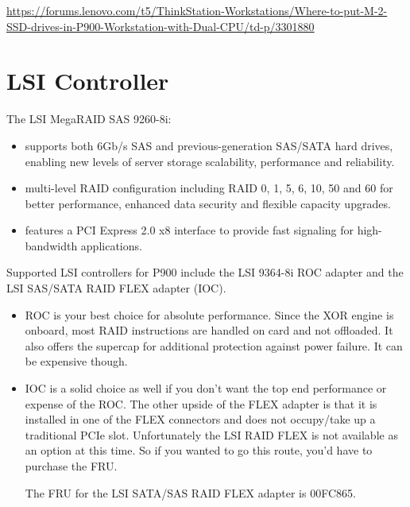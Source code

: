 \url{https://forums.lenovo.com/t5/ThinkStation-Workstations/Where-to-put-M-2-SSD-drives-in-P900-Workstation-with-Dual-CPU/td-p/3301880}



\section{LSI Controller}

The LSI MegaRAID SAS 9260-8i:

\begin{itemize}
   \item  supports both 6Gb/s SAS and
   previous-generation SAS/SATA hard drives, enabling new levels of server
   storage scalability, performance and reliability.   
   
   \item multi-level RAID configuration including RAID 0, 1, 5, 6, 10, 50 and 60
   for better performance, enhanced data security and flexible capacity upgrades.
   
   \item features a PCI Express 2.0 x8 interface to provide fast signaling for
   high-bandwidth applications. 
 \end{itemize}
 

Supported LSI controllers for P900 include the LSI 9364-8i ROC adapter and the
LSI SAS/SATA RAID FLEX adapter (IOC).

\begin{itemize}
  
  \item    ROC is your best choice for absolute performance.  Since the XOR
  engine is onboard, most RAID instructions are handled on card and not
  offloaded.  It also offers the supercap for additional protection against
  power failure.  It can be expensive though.

  \item IOC is a solid choice as well if you don't want the top end performance
  or expense of the ROC.  The other upside of the FLEX adapter is that it is
  installed in one of the FLEX connectors and does not occupy/take up a
  traditional PCIe slot.  Unfortunately the LSI RAID FLEX is not available as an
  option at this time.  So if you wanted to go this route, you'd have to
  purchase the FRU.



The FRU for the LSI SATA/SAS RAID FLEX adapter is 00FC865.
\end{itemize}



